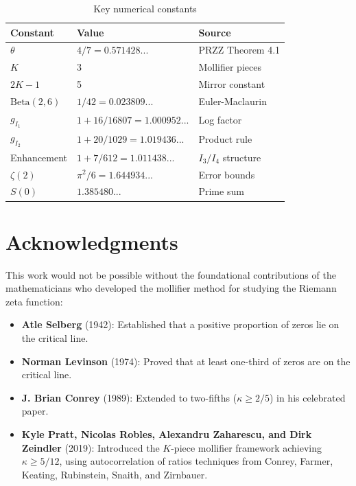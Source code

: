 \documentclass[11pt]{article}
\begin{document}
\begin{table}[h]
\centering
\caption{Key numerical constants}
\begin{tabular}{lll}
\toprule
Constant & Value & Source \\
\midrule
$\theta$ & $4/7 = 0.571428...$ & PRZZ Theorem 4.1 \\
$K$ & 3 & Mollifier pieces \\
$2K-1$ & 5 & Mirror constant \\
$\text{Beta}(2,6)$ & $1/42 = 0.023809...$ & Euler-Maclaurin \\
$g_{I_1}$ & $1 + 16/16807 = 1.000952...$ & Log factor \\
$g_{I_2}$ & $1 + 20/1029 = 1.019436...$ & Product rule \\
Enhancement & $1 + 7/612 = 1.011438...$ & $I_3/I_4$ structure \\
$\zeta(2)$ & $\pi^2/6 = 1.644934...$ & Error bounds \\
$S(0)$ & $1.385480...$ & Prime sum \\
\bottomrule
\end{tabular}
\end{table}

\section{Acknowledgments}
\label{app:acknowledgments}

This work would not be possible without the foundational contributions of the mathematicians who developed the mollifier method for studying the Riemann zeta function:

\begin{itemize}
\item \textbf{Atle Selberg} (1942): Established that a positive proportion of zeros lie on the critical line.
\item \textbf{Norman Levinson} (1974): Proved that at least one-third of zeros are on the critical line.
\item \textbf{J. Brian Conrey} (1989): Extended to two-fifths ($\kappa \geq 2/5$) in his celebrated paper.
\item \textbf{Kyle Pratt, Nicolas Robles, Alexandru Zaharescu, and Dirk Zeindler} (2019): Introduced the $K$-piece mollifier framework achieving $\kappa \geq 5/12$, using autocorrelation of ratios techniques from Conrey, Farmer, Keating, Rubinstein, Snaith, and Zirnbauer.
\end{itemize}
\end{document}
